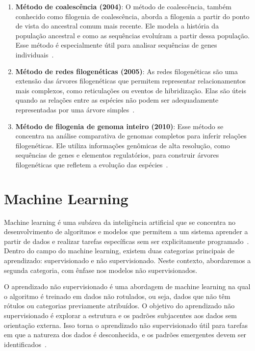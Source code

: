 \begin{enumerate}
  \item \textbf{Método de coalescência (2004)}: O método de coalescência, também conhecido como filogenia de coalescência, aborda a filogenia a partir do ponto de vista do ancestral comum mais recente. Ele modela a história da população ancestral e como as sequências evoluíram a partir dessa população. Esse método é especialmente útil para analisar sequências de genes individuais~\cite{kingman_coalescent_1982}.
  \item \textbf{Método de redes filogenéticas (2005)}: As redes filogenéticas são uma extensão das árvores filogenéticas que permitem representar relacionamentos mais complexos, como reticulações ou eventos de hibridização. Elas são úteis quando as relações entre as espécies não podem ser adequadamente representadas por uma árvore simples~\cite{huson_phylogenetic_networks_2006}.
  \item \textbf{Método de filogenia de genoma inteiro (2010)}: Esse método se concentra na análise comparativa de genomas completos para inferir relações filogenéticas. Ele utiliza informações genômicas de alta resolução, como sequências de genes e elementos regulatórios, para construir árvores filogenéticas que refletem a evolução das espécies~\cite{eisen_horizontal_gene_transfre_2000}.
\end{enumerate}

\section{Machine Learning}
Machine learning é uma subárea da inteligência artificial que se concentra no desenvolvimento de algoritmos e modelos que permitem a um sistema aprender a partir de dados e realizar tarefas específicas sem ser explicitamente programado~\cite{deeplearning_goodfellow_2016}. Dentro do campo do machine learning, existem duas categorias principais de aprendizado: supervisionado e não supervisionado. Neste contexto, abordaremos a segunda categoria, com ênfase nos modelos não supervisionados.

O aprendizado não supervisionado é uma abordagem de machine learning na qual o algoritmo é treinado em dados não rotulados, ou seja, dados que não têm rótulos ou categorias previamente atribuídos. O objetivo do aprendizado não supervisionado é explorar a estrutura e os padrões subjacentes aos dados sem orientação externa. Isso torna o aprendizado não supervisionado útil para tarefas em que a natureza dos dados é desconhecida, e os padrões emergentes devem ser identificados~\cite{machine_learning_bishop_2006}.

